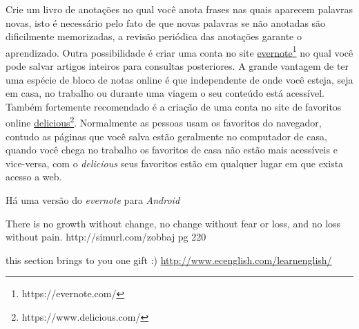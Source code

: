 Crie um livro de anotações no qual você anota frases nas quais aparecem
palavras novas, isto é necessário pelo fato de que novas palavras se não
anotadas são dificilmente memorizadas, a revisão periódica das anotações
garante o aprendizado. Outra possibilidade é criar uma conta no site
\href{https://evernote.com/}{evernote}\footnote{https://evernote.com/} no qual
você pode salvar artigos inteiros para consultas posteriores. A grande vantagem
de ter uma espécie de bloco de notas online é que independente de onde você
esteja, seja em casa, no trabalho ou durante uma viagem o seu conteúdo está
acessível.  Também fortemente recomendado é a criação de uma conta no site de
favoritos online
\href{https://www.delicious.com/}{delicious}\footnote{https://www.delicious.com/}.
Normalmente as pessoas usam os favoritos do navegador, contudo as páginas que
você salva estão geralmente no computador de casa, quando você chega no
trabalho os favoritos de casa não estão mais acessíveis e vice-versa, com
o {\em delicious} seus favoritos estão em qualquer lugar em que exista acesso
a web.

\vspace{0.3\baselineskip}
\noindent
{\footnotesize {}  Há uma versão do {\em evernote} para {\em Android}}

\vspace{0.3\baselineskip}
\noindent
{\footnotesize {} There is no growth without change, no change without fear or loss, and no loss
without pain. http://simurl.com/zobbaj  pg 220 }

\vspace{0.3\baselineskip}
\noindent
{\footnotesize {} this section brings to you one gift :) \href{http://www.ecenglish.com/learnenglish/}{http://www.ecenglish.com/learnenglish/} }

